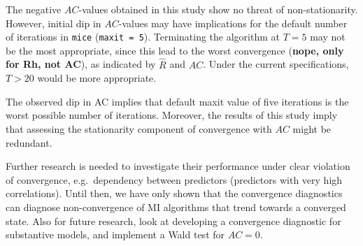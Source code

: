 \documentclass[Royal,times,sageh]{sagej}
\begin{document}
The negative \(AC\)-values obtained in this study show no threat of
non-stationarity. However, initial dip in \(AC\)-values may have
implications for the default number of iterations in \texttt{mice}
(\texttt{maxit\ =\ 5}). Terminating the algorithm at \(T=5\) may not be
the most appropriate, since this lead to the worst convergence
(\textbf{nope, only for Rh, not AC}), as indicated by \(\widehat{R}\)
and \(AC\). Under the current specifications, \(T>20\) would be more
appropriate.

The observed dip in AC implies that default maxit value of five
iterations is the worst possible number of iterations. Moreover, the
results of this study imply that assessing the stationarity component of
convergence with \(AC\) might be redundant.

Further research is needed to investigate their performance under clear
violation of convergence, e.g.~dependency between predictors (predictors
with very high correlations). Until then, we have only shown that the
convergence diagnostics can diagnose non-convergence of MI algorithms
that trend towards a converged state. Also for future research, look at
developing a convergence diagnostic for substantive models, and
implement a Wald test for \(AC = 0\).



\end{document}
